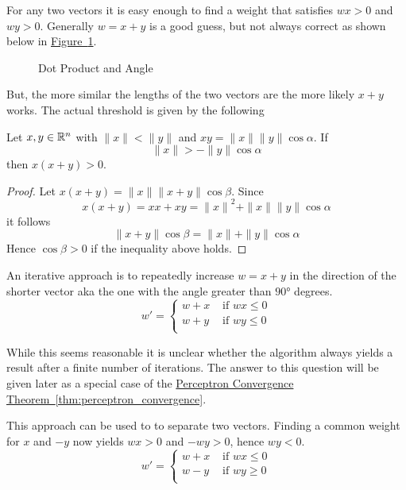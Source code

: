 For any two vectors it is easy enough to find a weight that satisfies \( wx > 0 \) and \( wy > 0 \).
Generally \( w = x + y \) is a good guess, but not always correct as shown below in
\hyperref[fig:vectorangle]{Figure~\ref*{fig:vectorangle}}.

\bigskip
\begin{figure}[H]
    \centering
    \plotvectorangle{}
    \caption{Dot Product and Angle}\label{fig:vectorangle}
\end{figure}
\bigskip

But, the more similar the lengths of the two vectors are the more likely \( x + y \) works.
The actual threshold is given by the following
\bigskip

\begin{lemma}
    Let \( x, y \in \mathbb{R}^n \) with \( \|x\| < \|y\| \) and \( xy = \|x\| \|y\| \cos\alpha \). If
    \[
        \|x\| > -\|y\|\cos\alpha
    \]
    then \( x(x + y) > 0 \).
\end{lemma}

\begin{proof}
    Let \( x(x + y) = \|x\| \|x + y\| \cos\beta \). Since
    \[
        x(x + y) = xx + xy = {\|x\|}^2 + \|x\| \|y\| \cos\alpha
    \]
    it follows
    \[
        {\|x + y\|}\cos\beta = \|x\| + \|y\|\cos\alpha
    \]
    Hence \( \cos\beta > 0 \) if the inequality above holds.
\end{proof}
\bigskip


An iterative approach is to repeatedly increase \( w = x + y \) in the direction of the shorter vector
aka the one with the angle greater than \( \ang{90} \) degrees.
\[
    w' = \left \{
    \begin{array}{ll}
        w + x & \text{ if } w x \le 0 \\
        w + y & \text{ if } w y \le 0 \\
    \end{array}
    \right.
\]

While this seems reasonable it is unclear whether the algorithm always yields a result after
a finite number of iterations. The answer to this question will be given later as a special case
of the \hyperref[thm:perceptron_convergence]{Perceptron Convergence Theorem~\ref*{thm:perceptron_convergence}}.

This approach can be used to to separate two vectors. Finding a common weight for  \( x \) and \( -y \)
now yields \( wx > 0 \) and \( -wy > 0 \), hence \( wy < 0 \).
\[
    w' = \left \{
    \begin{array}{ll}
        w + x & \text{ if } w x \le 0 \\
        w - y & \text{ if } w y \ge 0 \\
    \end{array}
    \right.
\]
\bigskip


